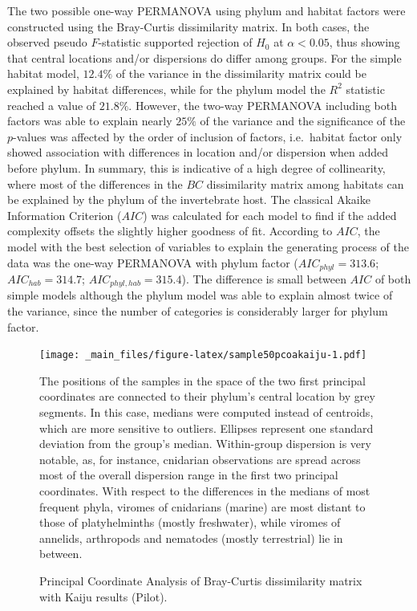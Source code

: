 \documentclass[
  openany]{book}
\begin{document}
The two possible one-way PERMANOVA using phylum and habitat factors were constructed using the Bray-Curtis dissimilarity matrix. In both cases, the observed pseudo \(F\)-statistic supported rejection of \(H_0\) at \(\alpha < 0.05\), thus showing that central locations and/or dispersions do differ among groups. For the simple habitat model, \(12.4\%\) of the variance in the dissimilarity matrix could be explained by habitat differences, while for the phylum model the \(R^2\) statistic reached a value of \(21.8\%\). However, the two-way PERMANOVA including both factors was able to explain nearly \(25\%\) of the variance and the significance of the \(p\)-values was affected by the order of inclusion of factors, i.e.~habitat factor only showed association with differences in location and/or dispersion when added before phylum. In summary, this is indicative of a high degree of collinearity, where most of the differences in the \(BC\) dissimilarity matrix among habitats can be explained by the phylum of the invertebrate host. The classical Akaike Information Criterion (\(AIC\)) was calculated for each model to find if the added complexity offsets the slightly higher goodness of fit. According to \(AIC\), the model with the best selection of variables to explain the generating process of the data was the one-way PERMANOVA with phylum factor (\(AIC_{phyl} = 313.6\); \(AIC_{hab} = 314.7\); \(AIC_{phyl,hab} = 315.4\)). The difference is small between \(AIC\) of both simple models although the phylum model was able to explain almost twice of the variance, since the number of categories is considerably larger for phylum factor.

\begin{figure}[!htbp]

\texttt{[image: \_main\_files/figure-latex/sample50pcoakaiju-1.pdf]}

\caption{Principal Coordinate Analysis of Bray-Curtis dissimilarity matrix with Kaiju results (Pilot).\label{fig:sample50pcoakaiju}}
The positions of the samples in the space of the two first principal coordinates are connected to their phylum's central location by grey segments. In this case, medians were computed instead of centroids, which are more sensitive to outliers. Ellipses represent one standard deviation from the group's median. Within-group dispersion is very notable, as, for instance, cnidarian observations are spread across most of the overall dispersion range in the first two principal coordinates. With respect to the differences in the medians of most frequent phyla, viromes of cnidarians (marine) are most distant to those of platyhelminths (mostly freshwater), while viromes of annelids, arthropods and nematodes (mostly terrestrial) lie in between.

\end{figure}
\end{document}
